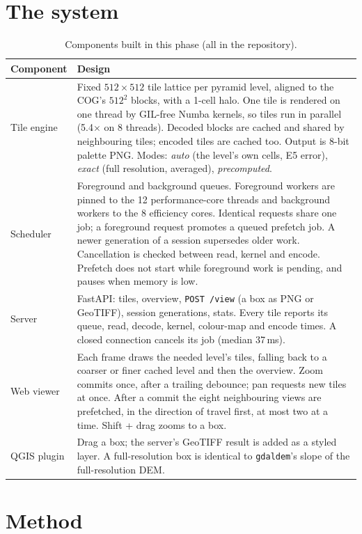 \documentclass[11pt,a4paper]{article}
\begin{document}
\section{The system}
\begin{table}[H]
\centering\small
\caption{Components built in this phase (all in the repository).}
\label{tab:system}
\begin{tabularx}{\linewidth}{>{\raggedright\arraybackslash}p{2.6cm}X}
\toprule
Component & Design \\
\midrule
Tile engine & Fixed $512\times512$ tile lattice per pyramid level, aligned to the COG's $512^2$ blocks, with a 1-cell halo.
One tile is rendered on one thread by GIL-free Numba kernels, so tiles run in parallel (5.4$\times$ on 8 threads).
Decoded blocks are cached and shared by neighbouring tiles; encoded tiles are cached too. Output is 8-bit palette
PNG. Modes: \emph{auto} (the level's own cells, E5 error), \emph{exact} (full resolution, averaged), \emph{precomputed}. \\
Scheduler & Foreground and background queues. Foreground workers are pinned to the 12 performance-core threads and
background workers to the 8 efficiency cores. Identical requests share one job; a foreground request promotes a
queued prefetch job. A newer generation of a session supersedes older work. Cancellation is checked between
read, kernel and encode. Prefetch does not start while foreground work is pending, and pauses when memory is low. \\
Server & FastAPI: tiles, overview, \texttt{POST /view} (a box as PNG or GeoTIFF), session generations, stats. Every
tile reports its queue, read, decode, kernel, colour-map and encode times. A closed connection cancels its job
(median 37\,ms). \\
Web viewer & Each frame draws the needed level's tiles, falling back to a coarser or finer cached level and then
the overview. Zoom commits once, after a trailing debounce; pan requests new tiles at once. After a commit the eight
neighbouring views are prefetched, in the direction of travel first, at most two at a time. Shift + drag zooms to
a box. \\
QGIS plugin & Drag a box; the server's GeoTIFF result is added as a styled layer. A full-resolution box is identical
to \texttt{gdaldem}'s slope of the full-resolution DEM. \\
\bottomrule
\end{tabularx}
\end{table}

\section{Method}
\end{document}
